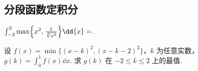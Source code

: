 \subsection{分段函数定积分}

	\begin{ti}
		$\int_{-2}^{2} \max\Bigl\{ x^{2}, \frac{1}{\sqrt[3]{x^{2}}} \Bigr\} \dd{x} = $\htwo.
	\end{ti}

	\begin{ti}
		设 $f(x) = \min\bigl\{ (x - k)^{2}, (x - k - 2)^{2} \bigr\}$，$k$ 为任意实数，$g(k) = \int_{0}^{1} f(x) \dd{x}$. 求 $g(k)$ 在 $-2 \leq k \leq 2$ 上的最值.
	\end{ti}